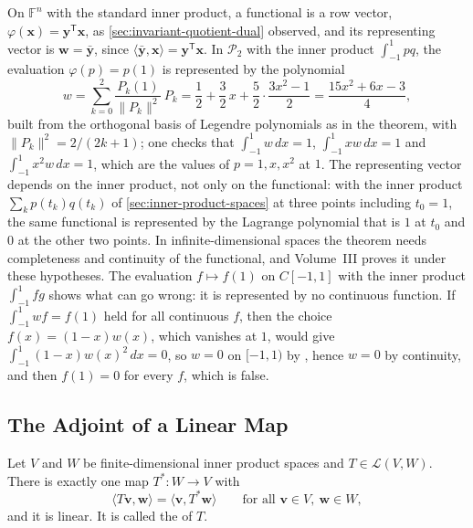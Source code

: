 On $\mathbb F^n$ with the standard inner product, a functional is a row vector, $\varphi(\mathbf x)=\mathbf y^{\mathsf T}\mathbf x$, as \cref{sec:invariant-quotient-dual} observed, and its representing vector is $\mathbf w=\bar{\mathbf y}$, since $\langle\bar{\mathbf y},\mathbf x\rangle=\mathbf y^{\mathsf T}\mathbf x$. In $\mathcal P_2$ with the inner product $\int_{-1}^1pq$, the evaluation $\varphi(p)=p(1)$ is represented by the polynomial
\[
w=\sum_{k=0}^2\frac{P_k(1)}{\|P_k\|^2}\,P_k=\frac12+\frac32\,x+\frac52\cdot\frac{3x^2-1}2=\frac{15x^2+6x-3}4 ,
\]
built from the orthogonal basis of Legendre polynomials as in the theorem, with $\|P_k\|^2=2/(2k+1)$; one checks that $\int_{-1}^1w\,dx=1$, $\int_{-1}^1xw\,dx=1$ and $\int_{-1}^1x^2w\,dx=1$, which are the values of $p=1,x,x^2$ at $1$. The representing vector depends on the inner product, not only on the functional: with the inner product $\sum_kp(t_k)q(t_k)$ of \cref{sec:inner-product-spaces} at three points including $t_0=1$, the same functional is represented by the Lagrange polynomial that is $1$ at $t_0$ and $0$ at the other two points. In infinite-dimensional spaces the theorem needs completeness and continuity of the functional, and Volume~III proves it under these hypotheses. The evaluation $f\mapsto f(1)$ on $C[-1,1]$ with the inner product $\int_{-1}^1fg$ shows what can go wrong: it is represented by no continuous function. If $\int_{-1}^1wf=f(1)$ held for all continuous $f$, then the choice $f(x)=(1-x)w(x)$, which vanishes at $1$, would give $\int_{-1}^1(1-x)w(x)^2\,dx=0$, so $w=0$ on $[-1,1)$ by , hence $w=0$ by continuity, and then $f(1)=0$ for every $f$, which is false.

\subsection{The Adjoint of a Linear Map}

\begin{theorem}[Adjoint]
\label{thm:adjoint}
Let $V$ and $W$ be finite-dimensional inner product spaces and $T\in\mathcal L(V,W)$. There is exactly one map $T^*\colon W\to V$ with
\[
\langle T\mathbf v,\mathbf w\rangle=\langle\mathbf v,T^*\mathbf w\rangle\qquad\text{for all }\mathbf v\in V,\ \mathbf w\in W,
\]
and it is linear. It is called the  of $T$.
\end{theorem}

